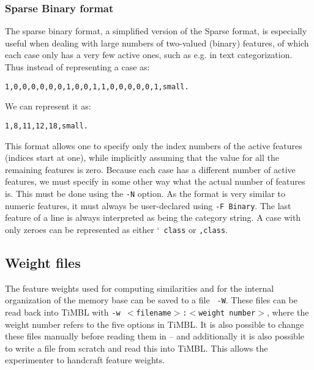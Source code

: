\documentclass{book}
\begin{document}
\subsubsection{Sparse Binary format}
\label{binaryformat}

The sparse binary format, a simplified version of the Sparse format,
is especially useful when dealing with large numbers of two-valued
(binary) features, of which each case only has a very few active ones,
such as e.g. in text categorization. Thus instead of representing a
case as:

\begin{footnotesize}
\begin{verbatim}
1,0,0,0,0,0,0,1,0,0,1,1,0,0,0,0,0,1,small.
\end{verbatim}
\end{footnotesize}

We can represent it as:

\begin{footnotesize}
\begin{verbatim}
1,8,11,12,18,small.
\end{verbatim}
\end{footnotesize}

This format allows one to specify only the index numbers of the active
features (indices start at one), while implicitly assuming that the
value for all the remaining features is zero. Because each case has a
different number of active features, we must specify in some other way
what the actual number of features is. This must be done using the
{\tt -N} option.  As the format is very similar to numeric features,
it must always be user-declared using {\tt -F Binary}. The last
feature of a line is always interpreted as being the category
string. A case with only zeroes can be represented as either `{\tt
class} or {\tt ,class}.

\subsection{Weight files}
\label{weightformat}

The feature weights used for computing similarities and for the
internal organization of the memory base can be saved to a file {\tt
  -W}. These files can be read back into TiMBL with {\tt -w
  $<$filename$>$:$<$weight number$>$}, where the weight number refers to the
five options in TiMBL. It is also possible to change these files
manually before reading them in -- and additionally it is also
possible to write a file from scratch and read this into TiMBL. This
allows the experimenter to handcraft feature weights.
\end{document}
